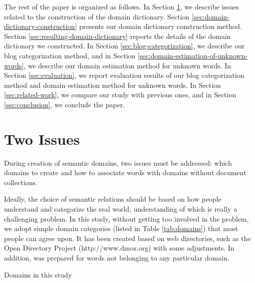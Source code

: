\documentclass[english]{jnlp_1.4_rep}
\newcommand{\dom}[1]{}
\begin{document}
The rest of the paper is organized as follows.
In Section \ref{sec:two-issues}, we describe issues related to 
the construction of the domain dictionary.
Section \ref{sec:domain-dictionary-construction} presents our domain
dictionary construction method.
Section \ref{sec:resulting-domain-dictionary} reports the details of the
domain dictionary we constructed.
In Section \ref{sec:blog-categorization}, we describe our blog
categorization method,
and in Section \ref{sec:domain-estimation-of-unknown-words}, we describe 
our domain estimation method for unknown words. 
In Section \ref{sec:evaluation}, we report evaluation results of our
blog categorization method and domain estimation method for unknown
words. 
In Section \ref{sec:related-work}, we compare our study with previous
ones, and in Section \ref{sec:conclusion},
we conclude the paper.

\section{Two Issues}
\label{sec:two-issues}

During creation of semantic domains, two issues must be addressed: which
domains to create and how to associate words with domains without
document collections.

Ideally, the choice of semantic relations should be based on how people
understand and categorize the real world, understanding of which is
really a challenging problem.
In this study, without getting too involved in the problem,
we adopt simple domain categories 
(listed in Table \ref{tab:domains})
that most people can agree upon.
It has been created based on web directories, such as the Open
Directory Project
(http://www.dmoz.org)
with some adjustments.
In addition, \dom{nodomain} was prepared for 
words not belonging to any particular domain.

\begin{table}[b]
\caption{Domains in this study}
\label{tab:domains}

\end{table}
\end{document}
